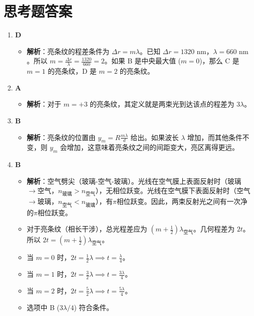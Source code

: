 \documentclass[UTF8]{ctexart}
\begin{document}
\section*{思考题答案}
\begin{enumerate}[label=\textbf{Q\arabic*.答案:}, leftmargin=*]
    \item \textbf{D}
        \begin{itemize}
            \item \textbf{解析}：亮条纹的程差条件为 $\Delta r = m\lambda$。已知 $\Delta r = 1320 \text{ nm}$，$\lambda = 660 \text{ nm}$。所以 $m = \frac{\Delta r}{\lambda} = \frac{1320}{660} = 2$。如果 B 是中央最大值 ($m=0$)，那么 C 是 $m=1$ 的亮条纹，D 是 $m=2$ 的亮条纹。
        \end{itemize}
    \item \textbf{A}
        \begin{itemize}
            \item \textbf{解析}：对于 $m=+3$ 的亮条纹，其定义就是两束光到达该点的程差为 $3\lambda$。
        \end{itemize}
    \item \textbf{B}
        \begin{itemize}
            \item \textbf{解析}：亮条纹的位置由 $y_m = R \frac{m\lambda}{d}$ 给出。如果波长 $\lambda$ 增加，而其他条件不变，则 $y_m$ 会增加，这意味着亮条纹之间的间距变大，亮区离得更远。
        \end{itemize}
    \item \textbf{B}
        \begin{itemize}
            \item \textbf{解析}：空气劈尖（玻璃-空气-玻璃）。光线在空气膜上表面反射时（玻璃$\to$空气，$n_{玻璃} > n_{空气}$），无相位跃变。光线在空气膜下表面反射时（空气$\to$玻璃，$n_{空气} < n_{玻璃}$），有$\pi$相位跃变。因此，两束反射光之间有一次净的$\pi$相位跃变。
            \item 对于亮条纹（相长干涉），总光程差应为 $(m + \frac{1}{2})\lambda_{空气}$。几何程差为 $2t$。所以 $2t = (m + \frac{1}{2})\lambda_{空气}$。
            \item 当 $m=0$ 时，$2t = \frac{1}{2}\lambda \implies t = \frac{\lambda}{4}$。
            \item 当 $m=1$ 时，$2t = \frac{3}{2}\lambda \implies t = \frac{3\lambda}{4}$。
            \item 当 $m=2$ 时，$2t = \frac{5}{2}\lambda \implies t = \frac{5\lambda}{4}$。
            \item 选项中 B ($3\lambda/4$) 符合条件。
        \end{itemize}
\end{enumerate}
\end{document}
